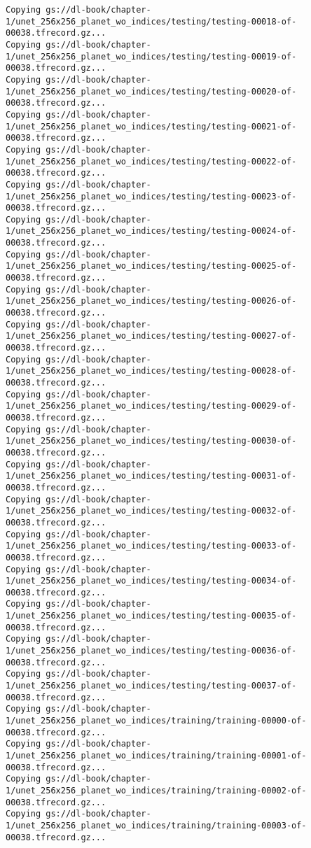 \documentclass[
  letterpaper,
  DIV=11,
  numbers=noendperiod]{scrreprt}
\begin{document}
\begin{verbatim}
Copying gs://dl-book/chapter-1/unet_256x256_planet_wo_indices/testing/testing-00018-of-00038.tfrecord.gz...
Copying gs://dl-book/chapter-1/unet_256x256_planet_wo_indices/testing/testing-00019-of-00038.tfrecord.gz...
Copying gs://dl-book/chapter-1/unet_256x256_planet_wo_indices/testing/testing-00020-of-00038.tfrecord.gz...
Copying gs://dl-book/chapter-1/unet_256x256_planet_wo_indices/testing/testing-00021-of-00038.tfrecord.gz...
Copying gs://dl-book/chapter-1/unet_256x256_planet_wo_indices/testing/testing-00022-of-00038.tfrecord.gz...
Copying gs://dl-book/chapter-1/unet_256x256_planet_wo_indices/testing/testing-00023-of-00038.tfrecord.gz...
Copying gs://dl-book/chapter-1/unet_256x256_planet_wo_indices/testing/testing-00024-of-00038.tfrecord.gz...
Copying gs://dl-book/chapter-1/unet_256x256_planet_wo_indices/testing/testing-00025-of-00038.tfrecord.gz...
Copying gs://dl-book/chapter-1/unet_256x256_planet_wo_indices/testing/testing-00026-of-00038.tfrecord.gz...
Copying gs://dl-book/chapter-1/unet_256x256_planet_wo_indices/testing/testing-00027-of-00038.tfrecord.gz...
Copying gs://dl-book/chapter-1/unet_256x256_planet_wo_indices/testing/testing-00028-of-00038.tfrecord.gz...
Copying gs://dl-book/chapter-1/unet_256x256_planet_wo_indices/testing/testing-00029-of-00038.tfrecord.gz...
Copying gs://dl-book/chapter-1/unet_256x256_planet_wo_indices/testing/testing-00030-of-00038.tfrecord.gz...
Copying gs://dl-book/chapter-1/unet_256x256_planet_wo_indices/testing/testing-00031-of-00038.tfrecord.gz...
Copying gs://dl-book/chapter-1/unet_256x256_planet_wo_indices/testing/testing-00032-of-00038.tfrecord.gz...
Copying gs://dl-book/chapter-1/unet_256x256_planet_wo_indices/testing/testing-00033-of-00038.tfrecord.gz...
Copying gs://dl-book/chapter-1/unet_256x256_planet_wo_indices/testing/testing-00034-of-00038.tfrecord.gz...
Copying gs://dl-book/chapter-1/unet_256x256_planet_wo_indices/testing/testing-00035-of-00038.tfrecord.gz...
Copying gs://dl-book/chapter-1/unet_256x256_planet_wo_indices/testing/testing-00036-of-00038.tfrecord.gz...
Copying gs://dl-book/chapter-1/unet_256x256_planet_wo_indices/testing/testing-00037-of-00038.tfrecord.gz...
Copying gs://dl-book/chapter-1/unet_256x256_planet_wo_indices/training/training-00000-of-00038.tfrecord.gz...
Copying gs://dl-book/chapter-1/unet_256x256_planet_wo_indices/training/training-00001-of-00038.tfrecord.gz...
Copying gs://dl-book/chapter-1/unet_256x256_planet_wo_indices/training/training-00002-of-00038.tfrecord.gz...
Copying gs://dl-book/chapter-1/unet_256x256_planet_wo_indices/training/training-00003-of-00038.tfrecord.gz...

\end{verbatim}
\end{document}
